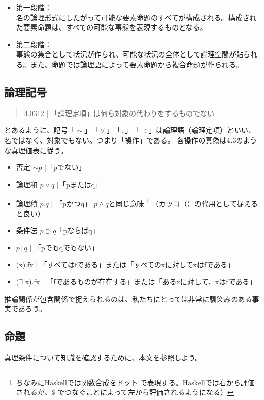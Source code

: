 \documentclass[a4paper,onecolumn,article]{jarticle}
\newcounter{ct}               %
\begin{document}
{\begin{itemize}
\item 第一段階：\\ 名の論理形式にしたがって可能な要素命題のすべてが構成される。構成された要素命題は、すべての可能な事態を表現するものとなる。
\item 第二段階：\\ 事態の集合として状況が作られ、可能な状況の全体として論理空間が貼られる。また、命題では論理語によって要素命題から複合命題が作られる。

\end{itemize}


\subsection{論理記号}
\begin{quote}
  4.0312 | 「論理定項」は何ら対象の代わりをするものでない
\end{quote}
 とあるように、記号$「\sim」「\vee」 「\, . \,」 「\supset」$は論理語（論理定項）といい、名ではなく、対象でもない。つまり「操作」である。
各操作の真偽は4.3のような真理値表に従う。

\begin{itemize}
  \item 否定 $\sim p$ |「pでない」
  \item 論理和 $p\vee q$ |「pまたはq」
  \item 論理積 $p.q$ | 「pかつq」 $p \wedge q$と同じ意味 \footnote{ちなみにHaskellでは関数合成をドット$.$で表現する。Haskellでは右から評価されるが、\$ でつなぐことによって左から評価されるようになる）} （カッコ（）の代用として捉えると良い）
  \item 条件法 $p \supset q$「pならばq」
  \item $p \, | \, q$ | 「pでもqでもない」
  \item (x).fx |  「すべてはfである」または「すべてのxに対してxはfである」
  \item ($\exists$ x).fx | 「fであるものが存在する」または「あるxに対して、xはfである」
\end{itemize}

推論関係が包含関係で捉えられるのは、私たちにとっては非常に馴染みのある事実であろう。


\subsection{命題}

真理条件について知識を確認するために、本文を参照しよう。

}
\end{document}

